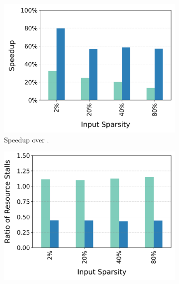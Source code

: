 \begin{figure}[t]
  \centering
  \begin{subfigure}{.33\textwidth}
    \centering
    \includegraphics[width=\textwidth]{Figures/Evaluations/if_then_else_few_scatter_speedup.png}
    \caption{Speedup over \ifconv.}
     \label{fig:if-then-else-few-scatter-speedup}
  \end{subfigure}%
  \begin{subfigure}{.33\textwidth}
    \centering
    \includegraphics[width=\textwidth]{Figures/Evaluations/if_then_else_few_scatter_resource_stalls.png}

\end{subfigure}
\end{figure}
